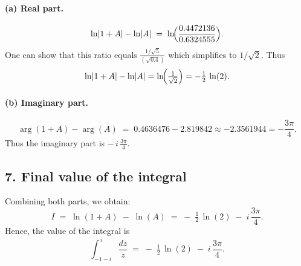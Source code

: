 \documentclass[12pt]{article}
\theoremstyle{definition} %
\theoremstyle{plain} %
\begin{document}
\paragraph{(a) Real part.}

\[
\ln\lvert 1 + A\rvert 
- \ln\lvert A\rvert
\;=\;
\ln\!\Bigl(\frac{0.4472136}{0.6324555}\Bigr).
\]
One can show that this ratio equals 
\(\tfrac{1/\sqrt{5}}{( \sqrt{0.4} )}\) which simplifies to \(1/\sqrt{2}\). Thus
\[
\ln\lvert 1 + A\rvert 
- \ln\lvert A\rvert
= \ln\!\Bigl(\tfrac{1}{\sqrt{2}}\Bigr)
= -\tfrac12\,\ln(2).
\]

\paragraph{(b) Imaginary part.}

\[
\arg(1 + A) - \arg(A)
\;=\;
0.4636476 - 2.819842
\approx -2.3561944
= -\frac{3\pi}{4}.
\]
Thus the imaginary part is 
\(-\,i\,\tfrac{3\pi}{4}\).

\subsection*{7. Final value of the integral}

Combining both parts, we obtain:
\[
I
\;=\;
\ln(1 + A) \;-\; \ln(A)
\;=\;
-\;\tfrac12\,\ln(2)
\;-\;
i \,\frac{3\pi}{4}.
\]
Hence, the value of the integral is
\[
\boxed{
\int_{-1 - i}^{\,i} \frac{dz}{z}
\;=\;
-\;\tfrac12\,\ln(2)
\;-\;
i\,\frac{3\pi}{4}.
}
\]
\end{document}
